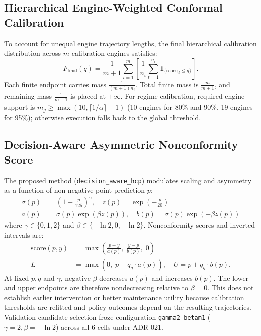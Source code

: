 \subsection{Hierarchical Engine-Weighted Conformal Calibration}
To account for unequal engine trajectory lengths, the final hierarchical calibration distribution across $m$ calibration engines satisfies:
\begin{equation}
F_{\text{final}}(q) = \frac{1}{m + 1} \sum_{i=1}^m \left[ \frac{1}{n_i} \sum_{t=1}^{n_i} \mathbf{1}_{\{\text{score}_{it} \le q\}} \right].
\end{equation}
Each finite endpoint carries mass $\frac{1}{(m+1)n_i}$. Total finite mass is $\frac{m}{m+1}$, and remaining mass $\frac{1}{m+1}$ is placed at $+\infty$. For regime calibration, required engine support is $m_g \ge \max(10, \lceil 1/\alpha \rceil - 1)$ (10 engines for 80\% and 90\%, 19 engines for 95\%); otherwise execution falls back to the global threshold.

\subsection{Decision-Aware Asymmetric Nonconformity Score}
The proposed method (\texttt{decision\_aware\_hcp}) modulates scaling and asymmetry as a function of non-negative point prediction $p$:
\begin{align}
\sigma(p) &= \left(1 + \frac{p}{125}\right)^\gamma, \quad z(p) = \exp\left(-\frac{p}{20}\right) \\
a(p) &= \sigma(p)\exp(\beta z(p)), \quad b(p) = \sigma(p)\exp(-\beta z(p))
\end{align}
where $\gamma \in \{0, 1, 2\}$ and $\beta \in \{-\ln 2, 0, +\ln 2\}$. Nonconformity scores and inverted intervals are:
\begin{align}
\text{score}(p, y) &= \max\left(\frac{p - y}{a(p)}, \; \frac{y - p}{b(p)}, \; 0\right) \\
L &= \max\left(0, \; p - q_g \cdot a(p)\right), \quad U = p + q_g \cdot b(p).
\end{align}
At fixed $p, q$ and $\gamma$, negative $\beta$ decreases $a(p)$ and increases $b(p)$. The lower and upper endpoints are therefore nondecreasing relative to $\beta=0$. This does not establish earlier intervention or better maintenance utility because calibration thresholds are refitted and policy outcomes depend on the resulting trajectories. Validation candidate selection froze configuration \texttt{gamma2\_betam1} ($\gamma=2, \beta=-\ln 2$) across all 6 cells under ADR-021.

